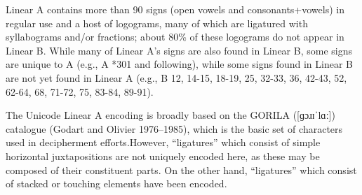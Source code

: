 Linear A contains more than 90 signs (open vowels and consonants+vowels) in regular use and a host of
logograms, many of which are ligatured with syllabograms and/or fractions; about 80\% of these
logograms do not appear in Linear B. While many of Linear A’s signs are also found in Linear B, some
signs are unique to A (e.g., A *301 and following), while some signs found in Linear B are not yet found
in Linear A (e.g., B 12, 14-15, 18-19, 25, 32-33, 36, 42-43, 52, 62-64, 68, 71-72, 75, 83-84, 89-91).

The Unicode Linear A encoding is broadly based on the GORILA ([{\arial ɡɔɹɪˈlɑː}]) catalogue
(Godart and Olivier 1976–1985), which is the basic set of characters used in decipherment efforts.However, “ligatures” which consist of simple horizontal juxtapositions are not uniquely encoded here, as
these may be composed of their constituent parts. On the other hand, “ligatures” which consist of stacked
or touching elements have been encoded. 





